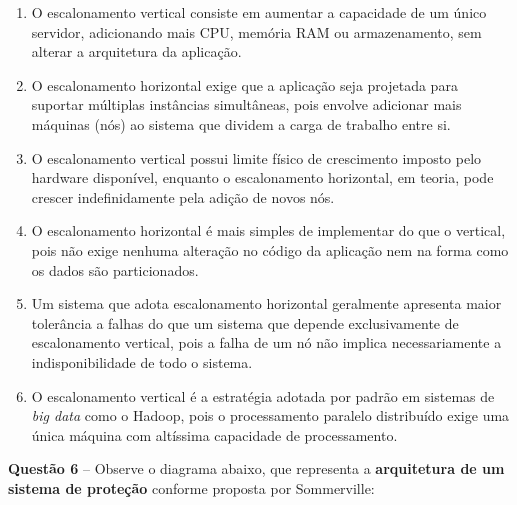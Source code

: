 \documentclass[12pt,a4paper]{article}
\begin{document}
\vspace{0.3cm}

\begin{enumerate}[label=\textbf{(\hspace{0.6cm})} ,leftmargin=2cm]

    \item O escalonamento vertical consiste em aumentar a capacidade de um único servidor, adicionando mais CPU, memória RAM ou armazenamento, sem alterar a arquitetura da aplicação.

    \item O escalonamento horizontal exige que a aplicação seja projetada para suportar múltiplas instâncias simultâneas, pois envolve adicionar mais máquinas (nós) ao sistema que dividem a carga de trabalho entre si.

    \item O escalonamento vertical possui limite físico de crescimento imposto pelo hardware disponível, enquanto o escalonamento horizontal, em teoria, pode crescer indefinidamente pela adição de novos nós.

    \item O escalonamento horizontal é mais simples de implementar do que o vertical, pois não exige nenhuma alteração no código da aplicação nem na forma como os dados são particionados.

    \item Um sistema que adota escalonamento horizontal geralmente apresenta maior tolerância a falhas do que um sistema que depende exclusivamente de escalonamento vertical, pois a falha de um nó não implica necessariamente a indisponibilidade de todo o sistema.

    \item O escalonamento vertical é a estratégia adotada por padrão em sistemas de \textit{big data} como o Hadoop, pois o processamento paralelo distribuído exige uma única máquina com altíssima capacidade de processamento.

\end{enumerate}

\vspace{0.5cm}

\textbf{Questão 6} -- Observe o diagrama abaixo, que representa a \textbf{arquitetura de um sistema de proteção} conforme proposta por Sommerville:
\end{document}
